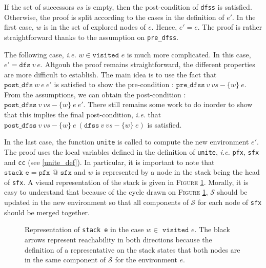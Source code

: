 \documentclass[a4 paper, 12pt]{article}
\begin{document}
{If the set of successors $vs$ is empty, then the post-condition of \texttt{dfss} is satisfied.
Otherwise, the proof is split according to the cases in the definition of $e'$. In the first case, $w$ is in the set of explored nodes of $e$. Hence, $e' = e$. The proof is rather straightforward thanks to the assumption on \texttt{pre\_dfss}.

\BlankLine

The following case, \textit{i.e.} $w \in \texttt{visited }e$ is much more complicated. In this case, $e' = \texttt{dfs}~v~e$. Altgouh the proof remains straightforward, the different properties are more difficult to establish. The main idea is to use the fact that $\texttt{post\_dfs}~w~e~e'$ is satisfied to show the pre-condition : $\texttt{pre\_dfss}~v~vs-\{w\}~e$. From the assumptions, we can obtain the post-condition : $\texttt{post\_dfss}~v~vs-\{w\}~e~e'$. There still remains some work to do inorder to show that this implies the final post-condition, \textit{i.e.} that $\texttt{post\_dfss}~v~vs-\{w\}~e~(\texttt{dfss}~v~vs-\{w\}~e)$ is satisfied.

\BlankLine

In the last case, the function \texttt{unite} is called to compute the new environment $e'$. The proof uses the local variables defined in the definition of \texttt{unite}, \textit{i.e.} \texttt{pfx}, \texttt{sfx} and \texttt{cc} (see \ref{unite_def}). In particular, it is important to note that $\texttt{stack e} = \texttt{pfx } @ \texttt{ sfx}$ and $w$ is represented by a node in the stack being the head of \texttt{sfx}. A visual representation of the stack is given in \textsc{Figure \ref{fig:partial_correctness_unite}}. Morally, it is easy to understand that because of the cycle drawn on \textsc{Figure \ref{fig:partial_correctness_unite}}, $\mathcal{S}$ should be updated in the new environment so that all components of $\mathcal{S}$ for each node of \texttt{sfx} should be merged together.

\begin{figure}[!h]
    \caption{Representation of \texttt{stack e} in the case $w \in \texttt{ visited } e$. The black arrows represent reachability in both directions because the definition of a representative on the stack states that both nodes are in the same component of $\mathcal{S}$ for the environment $e$.}\label{fig:partial_correctness_unite}
\end{figure}

\BlankLine

}
\end{document}
